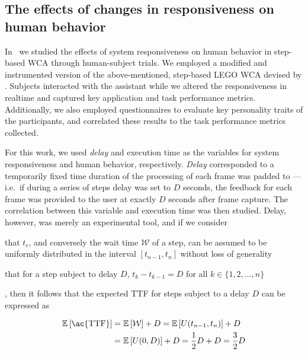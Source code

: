 \subsection{The effects of changes in responsiveness on human behavior}\label{ssec:plos}

In~\cite{olguinmunoz:impact2021} we studied the effects of system responsiveness on human behavior in step-based \ac{WCA} through human-subject trials.
We employed a modified and instrumented version of the above-mentioned, step-based LEGO \ac{WCA} devised by \textcite{Chen2015LEGO}.
Subjects interacted with the assistant while we altered the responsiveness in realtime and captured key application and task performance metrics.
Additionally, we also employed questionnaires to evaluate key personality traits of the participants, and correlated these results to the task performance metrics collected.

For this work, we used \emph{delay} and execution time as the variables for system responsiveness and human behavior, respectively.
\emph{Delay} corresponded to a temporarily fixed time duration of the processing of each frame was padded to --- i.e.\ if during a series of steps delay was set to \( D \) seconds, the feedback for each frame was provided to the user at exactly \( D \) seconds after frame capture.
The correlation between this variable and execution time was then studied.
Delay, however, was merely an experimental tool, and if we consider
\begin{enumerate*}[itemjoin={{; }}, itemjoin={{; and }}]
    \item that \( t_c \), and conversely the wait time \( \mathcal{W} \) of a step, can be assumed to be uniformly distributed in the interval \( [t_{n - 1}, t_n] \) without loss of generality~\cite{olguinmunoz:impact2021}
    \item that for a step subject to delay \( D \), \( t_k - t_{k - 1} = D \) for all \( k \in \{1, 2, \ldots, n\} \)
\end{enumerate*},
then it follows that the expected \ac{TTF} for steps subject to a delay \( D \) can be expressed as

\begin{align}
    \mathbb{E}\left[\text{\ac{TTF}}\right] &= \mathbb{E}\left[\mathcal{W}\right] + D
    = \mathbb{E}\left[U(t_{n - 1}, t_n)\right] + D\nonumber\\
    &= \mathbb{E}\left[U(0, D)\right] + D
    = \frac{1}{2}D + D = \frac{3}{2}D\label{eq:ttf}
\end{align}

